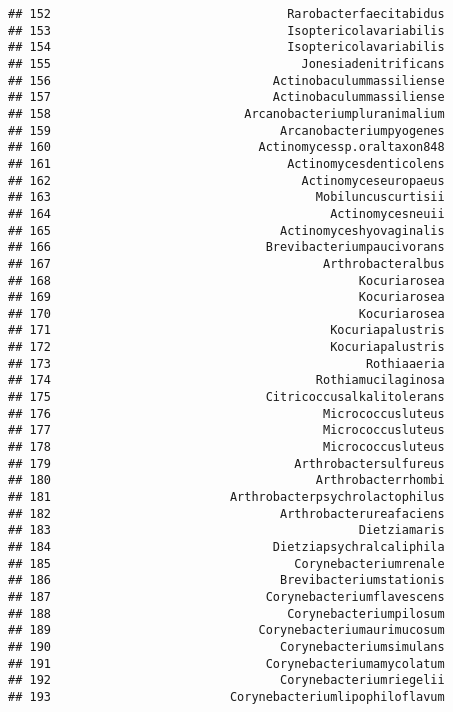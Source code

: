 \documentclass[
]{article}
\begin{document}
\begin{verbatim}
## 152                                 Rarobacterfaecitabidus
## 153                                 Isoptericolavariabilis
## 154                                 Isoptericolavariabilis
## 155                                   Jonesiadenitrificans
## 156                               Actinobaculummassiliense
## 157                               Actinobaculummassiliense
## 158                           Arcanobacteriumpluranimalium
## 159                                Arcanobacteriumpyogenes
## 160                             Actinomycessp.oraltaxon848
## 161                                 Actinomycesdenticolens
## 162                                   Actinomyceseuropaeus
## 163                                     Mobiluncuscurtisii
## 164                                       Actinomycesneuii
## 165                                Actinomyceshyovaginalis
## 166                              Brevibacteriumpaucivorans
## 167                                      Arthrobacteralbus
## 168                                           Kocuriarosea
## 169                                           Kocuriarosea
## 170                                           Kocuriarosea
## 171                                       Kocuriapalustris
## 172                                       Kocuriapalustris
## 173                                            Rothiaaeria
## 174                                     Rothiamucilaginosa
## 175                              Citricoccusalkalitolerans
## 176                                      Micrococcusluteus
## 177                                      Micrococcusluteus
## 178                                      Micrococcusluteus
## 179                                  Arthrobactersulfureus
## 180                                     Arthrobacterrhombi
## 181                         Arthrobacterpsychrolactophilus
## 182                                Arthrobacterureafaciens
## 183                                           Dietziamaris
## 184                               Dietziapsychralcaliphila
## 185                                  Corynebacteriumrenale
## 186                                Brevibacteriumstationis
## 187                              Corynebacteriumflavescens
## 188                                 Corynebacteriumpilosum
## 189                             Corynebacteriumaurimucosum
## 190                                Corynebacteriumsimulans
## 191                              Corynebacteriumamycolatum
## 192                                Corynebacteriumriegelii
## 193                         Corynebacteriumlipophiloflavum

\end{verbatim}
\end{document}
